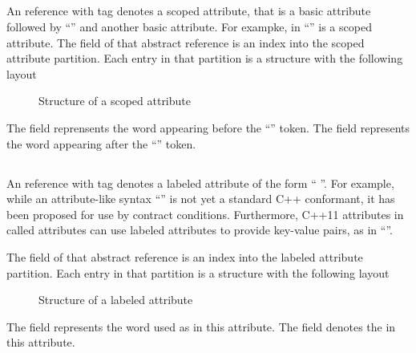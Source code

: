 

\subsection{}
\label{sec:ifc:AttrSort:Scoped}

An  reference with tag  denotes a scoped attribute, that is a
basic attribute followed by ``\code{::}'' and another basic attribute.
For exampke,  in ``'' is a scoped attribute.
The  field of that abstract reference is an index into the scoped attribute partition.
Each entry in that partition is a structure with the following layout
%
\begin{figure}[H]
    \centering
    \caption{Structure of a scoped attribute}
    \label{fig:ifc:AttrSort:Scoped}
\end{figure}
%
The  field reprensents the word appearing before the ``\code{::}'' token.
The  field represents the word appearing after the ``\code{::}'' token.


\subsection{}
\label{sec:ifc:AttrSort:Labeled}

An  reference with tag  denotes a labeled attribute of the form `` \code{:} ''.  For example,
while an attribute-like syntax ``\code{[[requires: x > 0]]}'' is not yet a standard C++ conformant, it has been proposed for use by contract conditions.  Furthermore, C++11 attributes in called 
attributes can use labeled attributes to provide key-value pairs, as in ``''.

The  field of that abstract reference is an index into the labeled attribute partition.  Each entry in that partition is a structure
with the following layout
%
\begin{figure}[H]
    \centering
    \caption{Structure of a labeled attribute}
    \label{fig:ifc:AttrSort:Labeled}
\end{figure}
%
The  field represents the word used as  in this attribute.
The  field denotes the  in this attribute.


